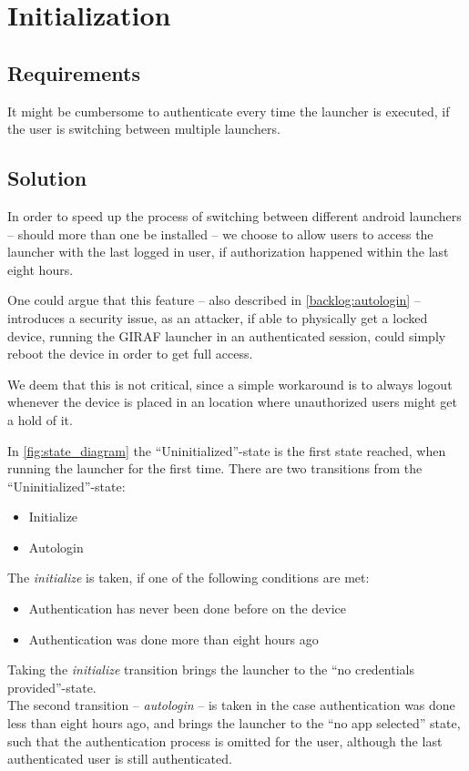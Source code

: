 \section{Initialization}
\label{design:initialization}

\subsection*{Requirements}
It might be cumbersome to authenticate every time the \giraf[] launcher is executed, if the user is switching between multiple launchers.

\subsection*{Solution}
In order to speed up the process of switching between different android launchers -- should more than one be installed -- we choose to allow users to access the launcher with the last logged in user, if authorization happened within the last eight hours.

One could argue that this feature -- also described in \autoref{backlog:autologin} -- introduces a security issue, as an attacker, if able to physically get a locked device, running the GIRAF launcher in an authenticated session, could simply reboot the device in order to get full access.

We deem that this is not critical, since a simple workaround is to always logout whenever the device is placed in an location where unauthorized users might get a hold of it.

In \autoref{fig:state_diagram} the ``Uninitialized''-state is the first state reached, when running the launcher for the first time. There are two transitions from the ``Uninitialized''-state:

\begin{itemize}
	\item Initialize
	\item Autologin
\end{itemize}

The \emph{initialize} is taken, if one of the following conditions are met: 

\begin{itemize}
	\item Authentication has never been done before on the device
	\item Authentication was done more than eight hours ago
\end{itemize}

Taking the \emph{initialize} transition brings the launcher to the ``no credentials provided''-state. \\

The second transition -- \emph{autologin} -- is taken in the case authentication was done less than eight hours ago, and brings the launcher to the ``no app selected'' state, such that the authentication process is omitted for the user, although the last authenticated user is still authenticated.